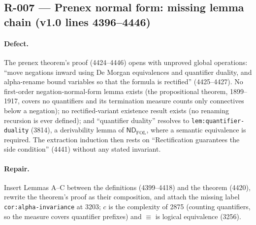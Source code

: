 \begingroup\small

\subsection*{R-007 --- Prenex normal form: missing lemma chain (v1.0 lines 4396--4446)}

\paragraph{Defect.}
The prenex theorem's proof (4424--4446) opens with unproved global operations:
``move negations inward using De Morgan equivalences and quantifier duality,
and alpha-rename bound variables so that the formula is rectified''
(4425--4427).  No first-order negation-normal-form lemma exists (the
propositional theorem, 1899--1917, covers no quantifiers and its termination
measure counts only connectives below a negation); no rectified-variant
existence result exists (no renaming recursion is ever defined); and
``quantifier duality'' resolves to \texttt{lem:quantifier-duality} (3814), a
derivability lemma of \(\mathsf{ND}_{\mathrm{FOL}}\), where a semantic
equivalence is required.  The extraction induction then rests on
``Rectification guarantees the side condition'' (4441) without any stated
invariant.

\paragraph{Repair.}
Insert Lemmas A--C between the definitions (4399--4418) and the theorem
(4420), rewrite the theorem's proof as their composition, and attach the
missing label \texttt{cor:alpha-invariance} at 3203; \(c\) is the complexity
of 2875 (counting quantifiers, so the measure covers quantifier prefixes) and
\(\equiv\) is logical equivalence (3256).

